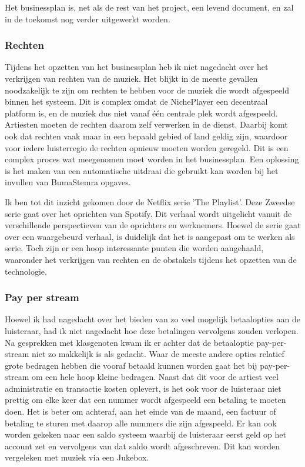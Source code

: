 Het businessplan is, net als de rest van het project, een levend document, en zal in de toekomst nog verder uitgewerkt worden.

\subsubsection*{Rechten}
Tijdens het opzetten van het businessplan heb ik niet nagedacht over het verkrijgen van rechten van de muziek. Het blijkt in de meeste gevallen noodzakelijk te zijn om rechten te hebben voor de muziek die wordt afgespeeld binnen het systeem. Dit is complex omdat de NichePlayer een decentraal platform is, en de muziek dus niet vanaf één centrale plek wordt afgespeeld. Artiesten moeten de rechten daarom zelf verwerken in de dienst. Daarbij komt ook dat rechten vaak maar in een bepaald gebied of land geldig zijn, waardoor voor iedere luisterregio de rechten opnieuw moeten worden geregeld. Dit is een complex proces wat meegenomen moet worden in het businessplan. Een oplossing is het maken van een automatische uitdraai die gebruikt kan worden bij het invullen van BumaStemra opgaves.

Ik ben tot dit inzicht gekomen door de Netflix serie ’The Playlist’. Deze Zweedse serie gaat over het oprichten van Spotify. Dit verhaal wordt uitgelicht vanuit de verschillende perspectieven van de oprichters en werknemers. Hoewel de serie gaat over een waargebeurd verhaal, is duidelijk dat het is aangepast om te werken als serie. Toch zijn er een hoop interessante punten die worden aangehaald, waaronder het verkrijgen van rechten en de obstakels tijdens het opzetten van de technologie.

\subsubsection*{Pay per stream}
Hoewel ik had nagedacht over het bieden van zo veel mogelijk betaalopties aan de luisteraar, had ik niet nagedacht hoe deze betalingen vervolgens zouden verlopen. Na gesprekken met klasgenoten kwam ik er achter dat de betaaloptie pay-per-stream niet zo makkelijk is als gedacht. Waar de meeste andere opties relatief grote bedragen hebben die vooraf betaald kunnen worden gaat het bij pay-per-stream om een hele hoop kleine bedragen. Naast dat dit voor de artiest veel administratie en transactie kosten oplevert, is het ook voor de luisteraar niet prettig om elke keer dat een nummer wordt afgespeeld een betaling te moeten doen. Het is beter om achteraf, aan het einde van de maand, een factuur of betaling te sturen met daarop alle nummers die zijn afgespeeld. Er kan ook worden gekeken naar een saldo systeem waarbij de luisteraar eerst geld op het account zet en vervolgens van dat saldo wordt afgeschreven. Dit kan worden vergeleken met muziek via een Jukebox.

